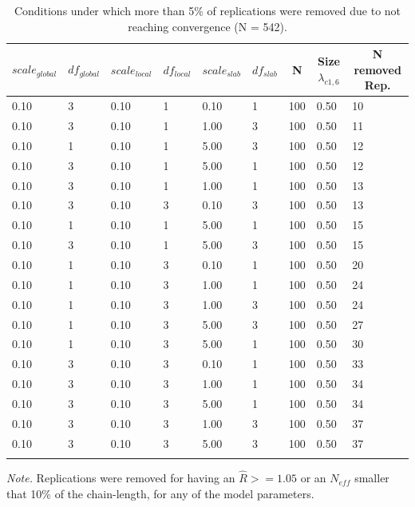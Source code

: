 \documentclass[
  english,
  man, donotrepeattitle,floatsintext]{apa6}
\begin{document}
\begin{table}[tbp]

\begin{center}
\begin{threeparttable}

\caption{\label{tab:unnamed-chunk-2}Conditions under which more than 5\% of replications were removed due to not reaching convergence (N = 542).}

\begin{tabular}{lllllllll}
\toprule
$scale_{global}$ & \multicolumn{1}{c}{$df_{global}$} & \multicolumn{1}{c}{$scale_{local}$} & \multicolumn{1}{c}{$df_{local}$} & \multicolumn{1}{c}{$scale_{slab}$} & \multicolumn{1}{c}{$df_{slab}$} & \multicolumn{1}{c}{N} & \multicolumn{1}{c}{Size $\lambda_{c1 , 6}$} & \multicolumn{1}{c}{N removed Rep.}\\
\midrule
0.10 & 3 & 0.10 & 1 & 0.10 & 1 & 100 & 0.50 & 10\\
0.10 & 3 & 0.10 & 1 & 1.00 & 3 & 100 & 0.50 & 11\\
0.10 & 1 & 0.10 & 1 & 5.00 & 3 & 100 & 0.50 & 12\\
0.10 & 3 & 0.10 & 1 & 5.00 & 1 & 100 & 0.50 & 12\\
0.10 & 3 & 0.10 & 1 & 1.00 & 1 & 100 & 0.50 & 13\\
0.10 & 3 & 0.10 & 3 & 0.10 & 3 & 100 & 0.50 & 13\\
0.10 & 1 & 0.10 & 1 & 5.00 & 1 & 100 & 0.50 & 15\\
0.10 & 3 & 0.10 & 1 & 5.00 & 3 & 100 & 0.50 & 15\\
0.10 & 1 & 0.10 & 3 & 0.10 & 1 & 100 & 0.50 & 20\\
0.10 & 1 & 0.10 & 3 & 1.00 & 1 & 100 & 0.50 & 24\\
0.10 & 1 & 0.10 & 3 & 1.00 & 3 & 100 & 0.50 & 24\\
0.10 & 1 & 0.10 & 3 & 5.00 & 3 & 100 & 0.50 & 27\\
0.10 & 1 & 0.10 & 3 & 5.00 & 1 & 100 & 0.50 & 30\\
0.10 & 3 & 0.10 & 3 & 0.10 & 1 & 100 & 0.50 & 33\\
0.10 & 3 & 0.10 & 3 & 1.00 & 1 & 100 & 0.50 & 34\\
0.10 & 3 & 0.10 & 3 & 5.00 & 1 & 100 & 0.50 & 34\\
0.10 & 3 & 0.10 & 3 & 1.00 & 3 & 100 & 0.50 & 37\\
0.10 & 3 & 0.10 & 3 & 5.00 & 3 & 100 & 0.50 & 37\\
\bottomrule
\addlinespace
\end{tabular}

\begin{tablenotes}[para]
\normalsize{\textit{Note.} Replications were removed for having an $\hat{R} >= 1.05$ or an $N_{eff}$  smaller that 10\% of the chain-length, for any of the model parameters.}
\end{tablenotes}

\end{threeparttable}
\end{center}

\end{table}
\end{document}
